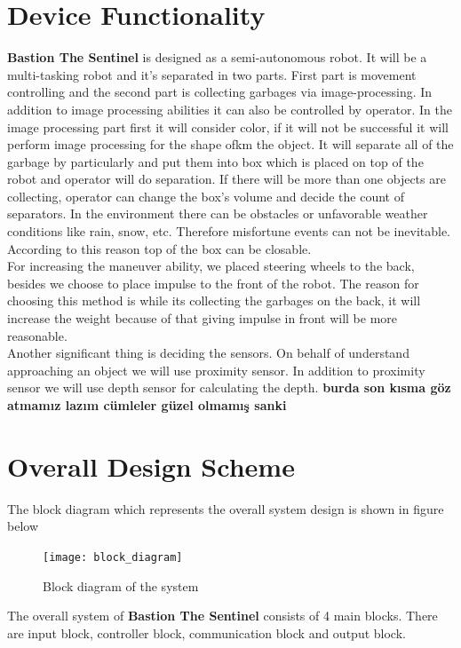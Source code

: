 \documentclass[12pt,a4paper]{article}
\begin{document}
\section{Device Functionality}
 \begin{flushleft}
  \textbf{Bastion The Sentinel} is designed as a semi-autonomous robot. It will be a multi-tasking robot and it's separated in 
  two parts. First part is movement controlling and the second part is collecting garbages via image-processing. In addition to 
  image processing abilities it can also be controlled by operator. In the image processing part first it will consider color, 
  if it will not be successful it will perform image processing for the shape ofkm the object. It will separate 
  all of the garbage by particularly and put them into box which is placed on top of the robot and operator will do separation. 
  If there will be more than one objects are collecting, operator can change the box's volume and decide the count of separators.
  In the environment there can be obstacles or unfavorable weather conditions like rain, snow, etc. Therefore misfortune events 
  can not be inevitable. According to this reason top of the box can be closable. \\
  For increasing the maneuver ability, we placed steering wheels to the back, besides we choose to place impulse to the front of 
  the robot. The reason for choosing this method is while its collecting the garbages on the back, it will increase the weight because 
  of that giving impulse in front will be more reasonable. \\
  Another significant thing is deciding the sensors. On behalf of understand 
  approaching an object we will use proximity sensor. In addition to proximity sensor we will use depth sensor for calculating the depth. 
  \textbf{burda son kısma göz atmamız lazım cümleler güzel olmamış sanki}
 \end{flushleft}
 
 \pagebreak
 \section{Overall Design Scheme}
 \begin{flushleft}
  The block diagram which represents the overall system design is shown in figure below\\
  \begin{figure}[h]
   \begin{center}
    \texttt{[image: block\_diagram]}
    \caption{Block diagram of the system}
   \end{center}
  \end{figure}
  The overall system of \textbf{Bastion The Sentinel} consists of 4 main blocks. There are input block, controller block, 
  communication block and output block.
 \end{flushleft}
 
\end{document}
